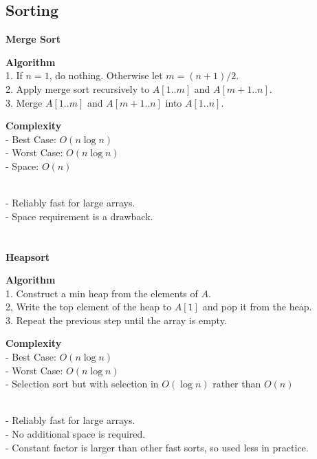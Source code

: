 \documentclass{article}
\begin{document}
\subsection{Sorting}
\textbf{Merge Sort}
\\
\begin{tcolorbox}
   \textbf{Algorithm} \\
   1. If $n = 1$, do nothing. Otherwise let $m = (n + 1)/2$. \\
   2. Apply merge sort recursively to $A[1..m]$ and $A[m + 1..n]$. \\
   3. Merge $A[1..m]$ and $A[m + 1..n]$ into $A[1..n]$.
\end{tcolorbox}
\begin{tcolorbox}
    \textbf{Complexity} \\
    - Best Case: $O(n\log n)$ \\
    - Worst Case: $O(n \log n)$ \\
    - Space: $O(n)$
\end{tcolorbox}
~\\
- Reliably fast for large arrays. \\
- Space requirement is a drawback. \\
\\\\
\textbf{Heapsort}
\\
\begin{tcolorbox}
    \textbf{Algorithm} \\
    1. Construct a min heap from the elements of $A$. \\
    2, Write the top element of the heap to $A[1]$ and pop it from the heap. \\
    3. Repeat the previous step until the array is empty.
\end{tcolorbox}
\begin{tcolorbox}
    \textbf{Complexity} \\
    - Best Case: $O(n \log n)$ \\
    - Worst Case: $O(n \log n)$ \\
    - Selection sort but with selection in $O(\log n)$ rather than $O(n)$
\end{tcolorbox}
~\\
- Reliably fast for large arrays. \\
- No additional space is required. \\
- Constant factor is larger than other fast sorts, so used less in practice.
\\\\
\end{document}
